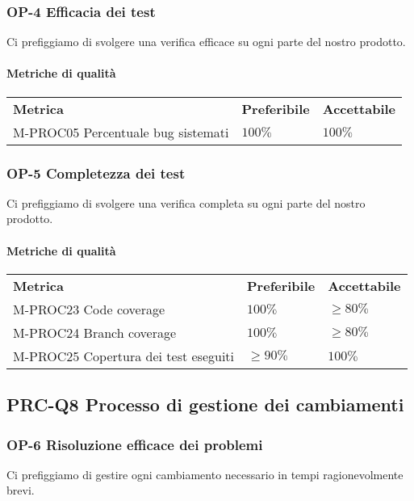 		\subsubsection{OP-4 Efficacia dei test}
			Ci prefiggiamo di svolgere una verifica efficace su ogni parte del nostro prodotto\glo.
			\paragraph{Metriche di qualità} \mbox{}
			\begin{longtable} {
					>{}p{80mm} 
					>{}p{25mm}
					>{}p{25mm}
				}
				\rowcolor{gray!50}
				\textbf{Metrica} & \textbf{Preferibile} & \textbf{Accettabile} \TBstrut \TBstrut \\
				M-PROC05 Percentuale bug sistemati & $100\%$ & $100\%$ \TBstrut \\ [2mm]
			\end{longtable}
		\subsubsection{OP-5 Completezza dei test}
		Ci prefiggiamo di svolgere una verifica completa su ogni parte del nostro prodotto\glo.
		\paragraph{Metriche di qualità} \mbox{}
		\begin{longtable} {
				>{}p{80mm} 
				>{}p{25mm}
				>{}p{25mm}
			}
			\rowcolor{gray!50}
			\textbf{Metrica} & \textbf{Preferibile} & \textbf{Accettabile} \TBstrut \TBstrut \\
			M-PROC23 Code coverage & $100\%$ & $\ge 80\%$ \TBstrut \\ [2mm]
			M-PROC24 Branch coverage & $100\%$ & $\ge 80\%$ \TBstrut \\ [2mm]
			M-PROC25 Copertura dei test eseguiti & $\ge 90\%$ & $100\%$ \TBstrut \\ [2mm]
		\end{longtable}	
			
	\subsection{PRC-Q8 Processo di gestione dei cambiamenti}
		\subsubsection{OP-6 Risoluzione efficace dei problemi}
			Ci prefiggiamo di gestire ogni cambiamento necessario in tempi ragionevolmente brevi.
